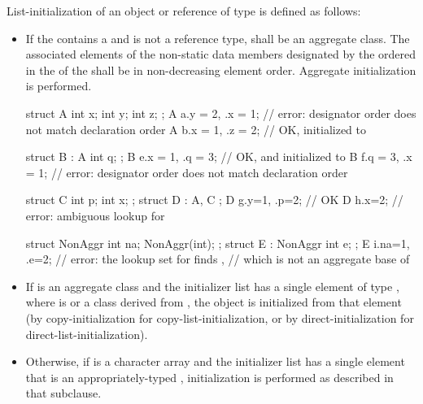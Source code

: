 \pnum
List-initialization of an object or reference of type   is defined as follows:
\begin{itemize}
\item
If the 
contains a  and
 is not a reference type,
 shall be an aggregate class.
The associated elements of the non-static data members
designated by the ordered 
in the 
of the 
shall be in non-decreasing element order.
Aggregate initialization is performed.
\begin{example}
\begin{codeblock}
struct A { int x; int y; int z; };
A a{.y = 2, .x = 1};                // error: designator order does not match declaration order
A b{.x = 1, .z = 2};                // OK,  initialized to 

struct B : A { int q; };
B e{.x = 1, .q = 3};                // OK,  and  initialized to 
B f{.q = 3, .x = 1};                // error: designator order does not match declaration order

struct C { int p; int x; };
struct D : A, C { };
D g{.y=1, .p=2};                    // OK
D h{.x=2};                          // error: ambiguous lookup for 

struct NonAggr { int na; NonAggr(int); };
struct E : NonAggr { int e; };
E i{.na=1, .e=2};                   // error: the lookup set for  finds ,
                                    // which is not an aggregate base of 
\end{codeblock}
\end{example}

\item If  is an aggregate class and the initializer list has a single element
of type  ,
where  is  or a class derived from ,
the object is initialized from that element (by copy-initialization for
copy-list-initialization, or by direct-initialization for
direct-list-initialization).

\item Otherwise, if  is a character array and the initializer list has a
single element that is an appropriately-typed ,
initialization is performed as described in that subclause.


\end{itemize}
